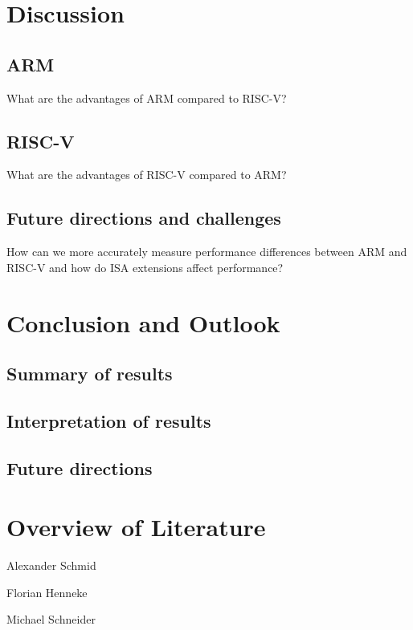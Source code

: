 \documentclass[conference]{IEEEtran}
\begin{document}
\section{Discussion}
\label{ref:discussion}
	\subsection{ARM}
	What are the advantages of ARM compared to RISC-V?
	\subsection{RISC-V}
	What are the advantages of RISC-V compared to ARM?
	\subsection{Future directions and challenges}
	How can we more accurately measure performance differences between ARM and RISC-V and how do ISA extensions affect performance?

\section{Conclusion and Outlook}
\label{ref:conclusion}
	\subsection{Summary of results}
	\subsection{Interpretation of results}
	\subsection{Future directions}

\section{Overview of Literature}
Alexander Schmid \cite{Akram2017} \cite{Arm2020} \cite{Asanovic2014} \cite{HeuiLee2001} \cite{Patterson2019} \cite{Perotti2020} \cite{Shore2015} \cite{Waterman2016} \cite{Xu2003}

Florian Henneke \cite{Waterman2016} \cite{Ryzhyk2006} \cite{Asanovic2014} \cite{Furber2000} \cite{Microsoft2020} \cite{Greenwaves2020} \cite{Aws2020} \cite{Microsoft2020}

Michael Schneider \cite{50years} \cite{hennessy2012computer} \cite{drechsler2020enhanced} \cite{WisconsinMadison2016} \cite{IEEE2018} \cite{Dirvin2019} \cite{Bandic2019}



\end{document}
